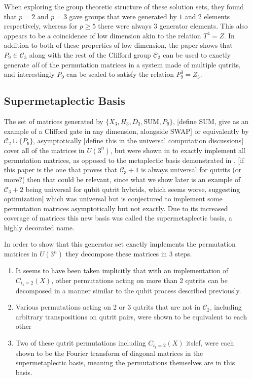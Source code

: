 When exploring the group theoretic structure of these solution sets, they found that $p = 2$ and $p = 3$ gave groups that were generated by $1$ and $2$ elements respectively, whereas for $p \geq 5$ there were always $3$ generator elements. This also appears to be a coincidence of low dimension akin to the relation $T^4 = Z$. In addition to both of these properties of low dimension, the paper \cite{arithmetics} shows that $P_9 \in \mathcal{C}_3$ along with the rest of the Clifford group $\mathcal{C}_2$ can be used to exactly generate \emph{all} of the permutation matrices in a system made of multiple qutrits, and interestingly $P_9$ can be scaled to satisfy the relation $P_9^3 = Z_3$.
\subsection{Supermetaplectic Basis}
The set of matrices generated by $\{X_3, H_3, D_3, \text{SUM}, P_9\}$, [define SUM, give as an example of a Clifford gate in any dimension, alongside SWAP] or equivalently by $\mathcal{C}_2 \cup \{P_9\}$, asymptotically [define this in the universal computation discussions] cover all of the matrices in $U\left(3^n\right)$, but were shown in \cite{arithmetics} to exactly implement all permutation matrices, as opposed to the metaplectic basis demonstrated in \cite{topological-anyon-thing}, [if this paper is the one that proves that $\mathcal{C}_3 + 1$ is always universal for qutrits (or more?) then that could be relevant, since what we show later is an example of $\mathcal{C}_3 + 2$ being universal for qubit qutrit hybrids, which seems worse, suggesting optimization] which was universal but is conjectured to implement some permutation matrices asymptotically but not exactly. Due to its increased coverage of matrices this new basis was called the supermetaplectic basis, a highly decorated name.

In order to show that this generator set exactly implements the permutation matrices in $U\left(3^n\right)$ they decompose these matrices in 3 steps.
\begin{enumerate}
\item It seems to have been taken implicitly that with an implementation of $C_{i_1 = 2}(X)$, other permutations acting on more than 2 qutrits can be decomposed in a manner similar to the qubit process described previously.
\item Various permutations acting on 2 or 3 qutrits that are not in $\mathcal{C}_2$, including arbitrary transpositions on qutrit pairs, were shown to be equivalent to each other
\item Two of these qutrit permutations including $C_{i_1=2}(X)$ itslef, were each shown to be the Fourier transform of diagonal matrices in the supermetaplectic basis, meaning the permutations themselves are in this basis.
\end{enumerate}

